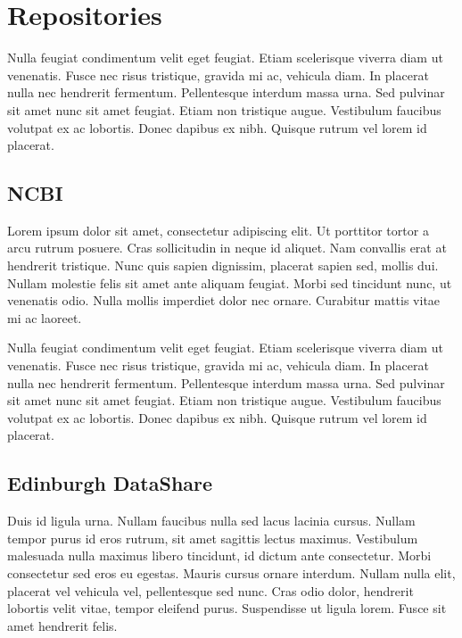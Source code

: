 
\section{Repositories} %
\label{sec:repositories}

Nulla feugiat condimentum velit eget feugiat. Etiam scelerisque viverra diam ut venenatis. Fusce nec risus tristique, gravida mi ac, vehicula diam. In placerat nulla nec hendrerit fermentum. Pellentesque interdum massa urna. Sed pulvinar sit amet nunc sit amet feugiat. Etiam non tristique augue. Vestibulum faucibus volutpat ex ac lobortis. Donec dapibus ex nibh. Quisque rutrum vel lorem id placerat.

\subsection{NCBI} %
\label{sub:ncbi}

Lorem ipsum dolor sit amet, consectetur adipiscing elit. Ut porttitor tortor a arcu rutrum posuere. Cras sollicitudin in neque id aliquet. Nam convallis erat at hendrerit tristique. Nunc quis sapien dignissim, placerat sapien sed, mollis dui. Nullam molestie felis sit amet ante aliquam feugiat. Morbi sed tincidunt nunc, ut venenatis odio. Nulla mollis imperdiet dolor nec ornare. Curabitur mattis vitae mi ac laoreet.

Nulla feugiat condimentum velit eget feugiat. Etiam scelerisque viverra diam ut venenatis. Fusce nec risus tristique, gravida mi ac, vehicula diam. In placerat nulla nec hendrerit fermentum. Pellentesque interdum massa urna. Sed pulvinar sit amet nunc sit amet feugiat. Etiam non tristique augue. Vestibulum faucibus volutpat ex ac lobortis. Donec dapibus ex nibh. Quisque rutrum vel lorem id placerat.

\subsection{Edinburgh DataShare} %
\label{sub:edinburgh_datashare}

Duis id ligula urna. Nullam faucibus nulla sed lacus lacinia cursus. Nullam tempor purus id eros rutrum, sit amet sagittis lectus maximus. Vestibulum malesuada nulla maximus libero tincidunt, id dictum ante consectetur. Morbi consectetur sed eros eu egestas. Mauris cursus ornare interdum. Nullam nulla elit, placerat vel vehicula vel, pellentesque sed nunc. Cras odio dolor, hendrerit lobortis velit vitae, tempor eleifend purus. Suspendisse ut ligula lorem. Fusce sit amet hendrerit felis.

